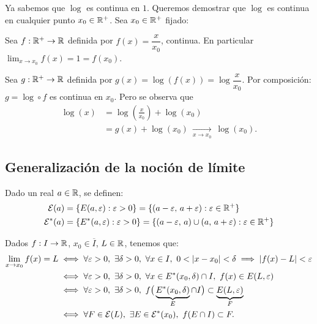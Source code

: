 \documentclass[11pt,a4paper]{article}
\newcommand{\Er}{E^{*}}                 %
\newcommand{\Cl}[1]{\overline{#1}}      %
\newcommand{\cE}{\mathcal{E}}           %
\begin{document}
\begin{ejemplo}
Ya sabemos que $\log$ es continua en $1$. Queremos demostrar que $\log$ es continua en cualquier punto $x_0\in\mathbb{R}^+$. Sea $x_0\in\mathbb{R}^+$ fijado:

Sea $f:\mathbb{R}^+\to\mathbb{R}$ definida por $f(x)=\dfrac{x}{x_0}$, continua. En particular $\displaystyle\lim_{x\to x_0}f(x)=1=f(x_0)$.

Sea $g:\mathbb{R}^+\to\mathbb{R}$ definida por $g(x)=\log(f(x))=\log\dfrac{x}{x_0}$. Por composición: $g=\log\circ f$ es continua en $x_0$. Pero se observa que
\begin{align*}
  \log(x) &= \log\left(\frac{x}{x_0}\right)+\log(x_0)\\
  &= g(x)+\log(x_0)\ \xrightarrow[x\to x_0]{}\ \log(x_0).
\end{align*}
\end{ejemplo}

\subsection{Generalización de la noción de límite}

\begin{notacion}
Dado un real $a\in\mathbb{R}$, se definen:
\begin{align*}
  \cE(a) &= \{E(a,\varepsilon):\varepsilon>0\} = \{(a-\varepsilon,\, a+\varepsilon):\varepsilon\in\R^+\}\\
  \cE^*(a) &= \{\Er(a,\varepsilon):\varepsilon>0\} = \{(a-\varepsilon,\, a)\cup(a,\, a+\varepsilon):\varepsilon\in\R^+\}
\end{align*}
\end{notacion}

\begin{observacion}
Dados $f:I\to\mathbb{R}$, $x_0\in\Cl{I}$, $L\in\mathbb{R}$, tenemos que:
\begin{align*}
  \lim_{x\to x_0}f(x)=L
  &\iff \forall\varepsilon>0,\ \exists\delta>0,\ \forall x\in I,\ 0<\abs{x-x_0}<\delta\implies\abs{f(x)-L}<\varepsilon\\
  &\iff \forall\varepsilon>0,\ \exists\delta>0,\ \forall x\in\Er(x_0,\delta)\cap I,\ f(x)\in E(L,\varepsilon)\\
  &\iff \forall\varepsilon>0,\ \exists\delta>0,\ f\big(\underbrace{\Er(x_0,\delta)}_{E}\cap I\big)\subset\underbrace{E(L,\varepsilon)}_{F}\\
  &\iff \forall F\in\cE(L),\ \exists E\in\cE^*(x_0),\ f(E\cap I)\subset F.
\end{align*}
\end{observacion}
\end{document}
